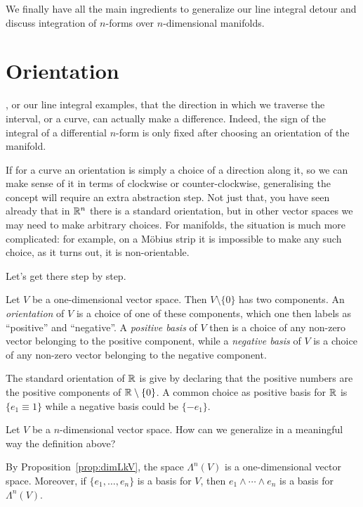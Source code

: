 We finally have all the main ingredients to generalize our line integral detour and discuss integration of $n$-forms over $n$-dimensional manifolds.

\section{Orientation}

, or our line integral examples, that the direction in which we traverse the interval, or a curve, can actually make a difference.
Indeed, the sign of the integral of a differential $n$-form is only fixed after choosing an orientation of the manifold.

If for a curve an orientation is simply a choice of a direction along it, so we can make sense of it in terms of clockwise or counter-clockwise, generalising the concept will require an extra abstraction step.
Not just that, you have seen already that in $\mathbb{R}^n$ there is a standard orientation, but in other vector spaces we may need to make arbitrary choices.
For manifolds, the situation is much more complicated: for example, on a M\"obius strip it is impossible to make any such choice, as it turns out, it is non-orientable.

Let's get there step by step.

\begin{definition}
  Let $V$ be a one-dimensional vector space. Then $V\setminus\{0\}$ has two components.
  An \emph{orientation} of $V$ is a choice of one of these components, which one then labels as ``positive'' and ``negative''.
  A \emph{positive basis} of $V$ then is a choice of any non-zero vector belonging to the positive component, while a \emph{negative basis} of $V$ is a choice of any non-zero vector belonging to the negative component.
\end{definition}

\begin{example}
  The standard orientation of $\mathbb{R}$ is give by declaring that the positive numbers are the positive components of $\mathbb{R}\setminus\{0\}$.
  A common choice as positive basis for $\mathbb{R}$ is $\{e_1 \equiv 1\}$ while a negative basis could be $\{-e_1\}$.
\end{example}

Let $V$ be a $n$-dimensional vector space.
How can we generalize in a meaningful way the definition above?

By Proposition~\eqref{prop:dimLkV}, the space $\Lambda^n(V)$ is a one-dimensional vector space.
Moreover, if $\{e_1,\ldots,e_n\}$ is a basis for $V$, then $e_1\wedge\cdots\wedge e_n$ is a basis for $\Lambda^n(V)$.

